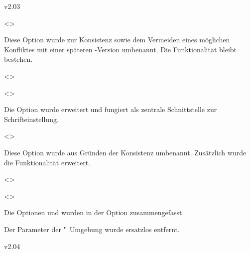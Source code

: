 \begin{NoIndexDefault}
\begin{Cessations}{v2.03}
\begin{Cessation}
  {}
  <>
\printdeclarationlist

Diese Option wurde zur Konsistenz sowie dem Vermeiden eines möglichen 
Konfliktes mit einer späteren \KOMAScript-Version umbenannt. Die Funktionalität 
bleibt bestehen.
\end{Cessation}

\begin{Cessation}
  {}
  <>
\begin{Cessation}
  {}
  <>
\printdeclarationlist

Die Option  wurde erweitert und fungiert als zentrale 
Schnittstelle zur Schrifteinstellung. 
\end{Cessation}
\end{Cessation}

\begin{Cessation}
  {}
  <>
\printdeclarationlist

Diese Option wurde aus Gründen der Konsistenz umbenannt. Zusätzlich wurde die 
Funktionalität erweitert.
\end{Cessation}

\begin{Cessation}
  {}
  <>
\begin{Cessation}
  {}
  <>
\printdeclarationlist

Die Optionen  und  wurden in der Option 
 zusammengefasst.
\end{Cessation}
\end{Cessation}

\begin{Declaration*}
  {}
\begin{Cessation}
  {}
\printdeclarationlist

Der Parameter  der 
"~Umgebung wurde ersatzlos entfernt.
\end{Cessation}
\end{Declaration*}
\end{Cessations}



\begin{Cessations}{v2.04}
\begin{Cessation}
  {}
\printdeclarationlist


\end{Cessation}
\end{Cessations}
\end{NoIndexDefault}

